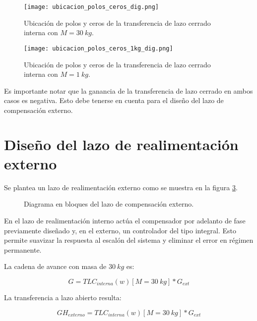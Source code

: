 \begin{figure}[H]
	\centering
	\texttt{[image: ubicacion\_polos\_ceros\_dig.png]}
	\caption{Ubicación de polos y ceros de la transferencia de lazo cerrado interna con $M=30\:kg$.}
	\label{fig:ubicacion_polos_y_ceros_dig}
\end{figure}

\begin{figure}[H]
	\centering
	\texttt{[image: ubicacion\_polos\_ceros\_1kg\_dig.png]}
	\caption{Ubicación de polos y ceros de la transferencia de lazo cerrado interna con $M=1\:kg$.}
	\label{fig:ubicacion_polos_y_ceros_1kg_dig}
\end{figure}

Es importante notar que la ganancia de la transferencia de lazo cerrado en ambos casos es negativa. Esto debe tenerse en cuenta para el diseño del lazo de compensación externo.





\section{Diseño del lazo de realimentación externo}

\noindent Se plantea un lazo de realimentación externo como se muestra en la figura \ref{fig:diag-externo_dig}. 

\begin{figure}[H]
	\centering
	
	\caption{Diagrama en bloques del lazo de compensación externo.}	\label{fig:diag-externo_dig}
\end{figure}

En el lazo de realimentación interno actúa el compensador por adelanto de fase previamente diseñado y, en el externo, un controlador del tipo integral. Esto permite suavizar la respuesta al escalón del sistema y eliminar el error en régimen permanente.



\noindent La cadena de avance con masa de $30\:kg$ es:

\begin{equation} \label{eq_cadena_avance_integrador}
	G=TLC_{interna}(w)[M=30\:kg]*G_{ext}
\end{equation}

La transferencia a lazo abierto resulta:

\begin{equation} \label{eq_lazo_abierto_externo}
	GH_{externo}=TLC_{interna}(w)[M=30\:kg]*G_{ext}
\end{equation}


